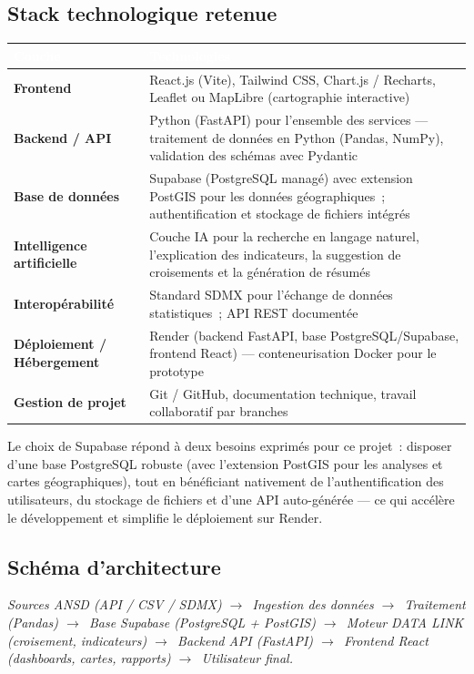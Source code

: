 \documentclass[11pt,a4paper]{article}
\newcommand{\arrowto}{$\rightarrow$}
\begin{document}
\subsection{Stack technologique retenue}

\begin{longtable}{@{}>{\bfseries}p{3.6cm} p{10.9cm}@{}}
\rowcolor{navy}
\textcolor{white}{Couche} & \textcolor{white}{Technologies} \\
\endhead
Frontend & React.js (Vite), Tailwind CSS, Chart.js / Recharts, Leaflet ou MapLibre (cartographie interactive) \\
Backend / API & Python (FastAPI) pour l'ensemble des services --- traitement de données en Python (Pandas, NumPy), validation des schémas avec Pydantic \\
Base de données & Supabase (PostgreSQL managé) avec extension PostGIS pour les données géographiques~; authentification et stockage de fichiers intégrés \\
Intelligence artificielle & Couche IA pour la recherche en langage naturel, l'explication des indicateurs, la suggestion de croisements et la génération de résumés \\
Interopérabilité & Standard SDMX pour l'échange de données statistiques~; API REST documentée \\
Déploiement / Hébergement & Render (backend FastAPI, base PostgreSQL/Supabase, frontend React) --- conteneurisation Docker pour le prototype \\
Gestion de projet & Git / GitHub, documentation technique, travail collaboratif par branches \\
\end{longtable}

Le choix de Supabase répond à deux besoins exprimés pour ce projet~: disposer d'une base PostgreSQL robuste (avec l'extension PostGIS pour les analyses et cartes géographiques), tout en bénéficiant nativement de l'authentification des utilisateurs, du stockage de fichiers et d'une API auto-générée --- ce qui accélère le développement et simplifie le déploiement sur Render.

\subsection{Schéma d'architecture}

\begin{quotebox}
\normalfont\itshape Sources ANSD (API / CSV / SDMX) \arrowto\ Ingestion des données \arrowto\ Traitement (Pandas) \arrowto\ Base Supabase (PostgreSQL + PostGIS) \arrowto\ Moteur DATA LINK (croisement, indicateurs) \arrowto\ Backend API (FastAPI) \arrowto\ Frontend React (dashboards, cartes, rapports) \arrowto\ Utilisateur final.
\end{quotebox}
\end{document}
